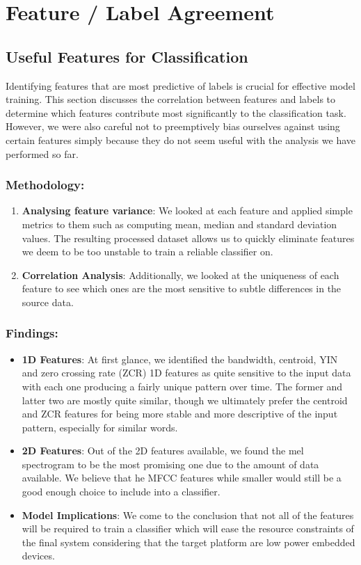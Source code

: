 \section{Feature / Label Agreement}

\subsection{Useful Features for Classification}

Identifying features that are most predictive of labels is crucial for effective model training. This section discusses the correlation between features and labels to determine which features contribute most significantly to the classification task. However, we were also careful not to preemptively bias ourselves against using certain features simply because they do not seem useful with the analysis we have performed so far.

\subsubsection{Methodology:}

\begin{enumerate}
    \item \textbf{Analysing feature variance}: We looked at each feature and applied simple metrics to them such as computing mean, median and standard deviation values. The resulting processed dataset allows us to quickly eliminate features we deem to be too unstable to train a reliable classifier on.
    \item \textbf{Correlation Analysis}: Additionally, we looked at the uniqueness of each feature to see which ones are the most sensitive to subtle differences in the source data.
\end{enumerate}

\subsubsection{Findings:}

\begin{itemize}
    \item \textbf{1D Features}: At first glance, we identified the bandwidth, centroid, YIN and zero crossing rate (ZCR) 1D features as quite sensitive to the input data with each one producing a fairly unique pattern over time. The former and latter two are mostly quite similar, though we ultimately prefer the centroid and ZCR features for being more stable and more descriptive of the input pattern, especially for similar words.
    \item \textbf{2D Features}: Out of the 2D features available, we found the mel spectrogram to be the most promising one due to the amount of data available. We believe that he MFCC features while smaller would still be a good enough choice to include into a classifier.
    \item \textbf{Model Implications}: We come to the conclusion that not all of the features will be required to train a classifier which will ease the resource constraints of the final system considering that the target platform are low power embedded devices.
\end{itemize}

